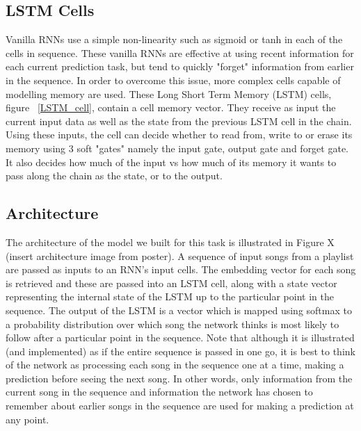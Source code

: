 \documentclass{article} %
\begin{document}
\subsection{LSTM Cells}
Vanilla RNNs use a simple non-linearity such as sigmoid or tanh in each of the cells in sequence. These vanilla RNNs are effective at using recent information for each current prediction task, but tend to quickly "forget" information from earlier in the sequence. In order to overcome this issue, more complex cells capable of modelling memory are used. These Long Short Term Memory (LSTM) cells, figure ~\ref{LSTM_cell}, contain a cell memory vector. They receive as input the current input data as well as the state from the previous LSTM cell in the chain. Using these inputs, the cell can decide whether to read from, write to or erase its memory using 3 soft "gates" namely the input gate, output gate and forget gate. It also decides how much of the input vs how much of its memory it wants to pass along the chain as the state, or to the output. \cite{LSTM} 

\subsection{Architecture}
The architecture of the model we built for this task is illustrated in Figure X (insert architecture image from poster). A sequence of input songs from a playlist are passed as inputs to an RNN's input cells. The embedding vector for each song is retrieved and these are passed into an LSTM cell, along with a state vector representing the internal state of the LSTM up to the particular point in the sequence. The output of the LSTM is a vector which is mapped using softmax to a probability distribution over which song the network thinks is most likely to follow after a particular point in the sequence. Note that although it is illustrated (and implemented) as if the entire sequence is passed in one go, it is best to think of the network as processing each song in the sequence one at a time, making a prediction before seeing the next song. In other words, only information from the current song in the sequence and information the network has chosen to remember about earlier songs in the sequence are used for making a prediction at any point.  
\end{document}

